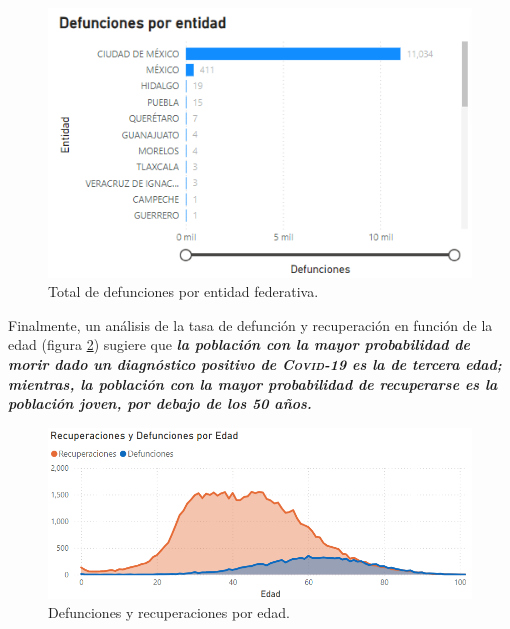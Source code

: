 \documentclass[a4paper,12pt]{article}
\begin{document}
\begin{figure}[!ht]
    \begin{center}
	\includegraphics[scale=0.8]{Def_por_entidad_powerbi.png}
    \end{center}
    \captionsetup{width=\linewidth}
    \caption{Total de defunciones por entidad federativa.}
    \label{fig:def_por_entidad}
\end{figure}

Finalmente, un análisis de la tasa de defunción y recuperación en función de la edad (figura \ref{fig:def_rec_por_edad}) sugiere que {\bfseries {\slshape la población con la mayor probabilidad de morir dado un diagnóstico positivo de {\scshape Covid-19} es la de tercera edad; mientras, la población con la mayor probabilidad de recuperarse es la población joven, por debajo de los 50 años.}}

\begin{figure}[!ht]
    \begin{center}
	\includegraphics[scale=0.6]{Def_rec_por_edad.png}
    \end{center}
    \captionsetup{width=\linewidth}
    \caption{Defunciones y recuperaciones por edad.}
    \label{fig:def_rec_por_edad}
\end{figure}
\end{document}
